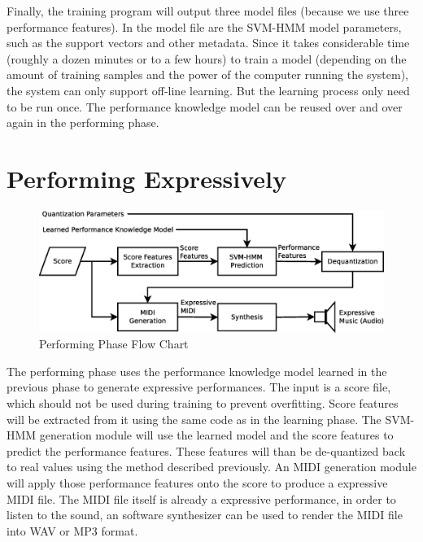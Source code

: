 Finally, the training program will output three model files (because we use three performance features). In the model file are the SVM-HMM model parameters, such as the support vectors and other metadata.  Since it takes considerable time (roughly a dozen minutes or to a few hours) to train a model (depending on the amount of training samples and the power of the computer running the system), the system can only support off-line learning. But the learning process only need to be run once. The performance knowledge model can be reused over and over again in the performing phase.



\section{Performing Expressively}
   \begin{figure}[tp]
      \begin{center}
         \includegraphics[width=\textwidth]{fig/perf_arch}
      \end{center}
      \caption{Performing Phase Flow Chart} 
      \label{fig:perfflow}
   \end{figure}
The performing phase uses the performance knowledge model learned in the previous phase to generate expressive performances. The input is a score file, which should not be used during training to prevent overfitting. Score features will be extracted from it using the same code as in the learning phase. The SVM-HMM generation module will use the learned model and the score features to predict the performance features. These features will than be de-quantized back to real values using the method described previously. An MIDI generation module will apply those performance features onto the score to produce a expressive MIDI file. The MIDI file itself is already a expressive performance, in order to listen to the sound, an software synthesizer can be used to render the MIDI file into WAV or MP3 format.
